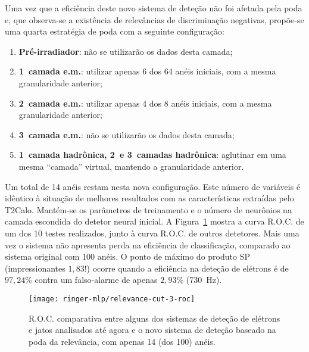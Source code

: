 
Uma vez que a eficiência deste novo sistema de deteção não foi afetada pela
poda e, que observa-se a existência de relevâncias de discriminação negativas,
propõe-se uma quarta estratégia de poda com a seguinte configuração:

\begin{enumerate}
\item \textbf{Pré-irradiador}: não se utilizarão os dados desta camada;
\item \textbf{1\eira\ camada e.m.}: utilizar apenas 6 dos 64 anéis iniciais,
com a mesma granularidade anterior;
\item \textbf{2\eira\ camada e.m.}: utilizar apenas 4 dos 8 anéis iniciais,
com a mesma granularidade anterior;
\item \textbf{3\eira\ camada e.m.}: não se utilizarão os dados desta camada;
\item \textbf{1\eira\ camada hadrônica, 2\eira\ e 3\eira\ camadas hadrônica}: aglutinar em uma mesma ``camada'' virtual, mantendo a granularidade anterior.
\end{enumerate} 

Um total de 14 anéis restam nesta nova configuração. Este número de variáveis
é idêntico à situação de melhores resultados com as características extraídas
pelo T2Calo. Mantém-se os parâmetros de treinamento e o número de neurônios na
camada escondida do detetor neural inicial. A Figura~\ref{fig:relev-cut-3-roc}
mostra a curva R.O.C. de um dos 10 testes realizados, junto à curva R.O.C. de
outros detetores. Mais uma vez o sistema não apresenta perda na eficiência de
classificação, comparado ao sistema original com 100 anéis. O ponto de máximo
do produto SP (impressionantes $1,83$!) ocorre quando a eficiência na deteção
de elétrons é de $97,24$\% contra um falso-alarme de apenas $2,93$\% (730~Hz).

\begin{figure}
\begin{center}
\texttt{[image: ringer-mlp/relevance-cut-3-roc]}
\end{center}
\caption{R.O.C. comparativa entre alguns dos sistemas de deteção de elétrons e
jatos analisados até agora e o novo sistema de deteção baseado na poda da
relevância, com apenas 14 (dos 100) anéis.}
\label{fig:relev-cut-3-roc}
\end{figure}

